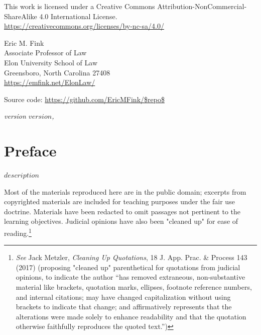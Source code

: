 \begin{small}
\raggedright{This work is licensed under a Creative Commons Attribution-NonCommercial-ShareAlike 4.0 International License.} \\
\url{https://creativecommons.org/licenses/by-nc-sa/4.0/}

\vspace{1em}

Eric M. Fink\\
Associate Professor of Law \\
Elon University School of Law \\
Greensboro, North Carolina 27408 \\
\url{https://emfink.net/ElonLaw/}

\vspace{1em}

Source code: \url{https://github.com/EricMFink/$repo$}

\itshape{version $version$, \monthyear}

\end{small}
\endgroup

\clearpage


\thispagestyle{empty}

\vspace*{\fill}
\vspace*{\fill}

\chapter*{Preface}

{$description$}

Most of the materials reproduced here are in the public domain; excerpts from copyrighted materials are included for teaching purposes under the fair use doctrine. Materials have been redacted to omit passages not pertinent to the learning objectives. Judicial opinions have also been "cleaned up" for ease of reading.\footnote{\textit{See} Jack Metzler, {\textit{Cleaning Up Quotations}}, 18 J. App. Prac. \& Process 143 (2017) (proposing "cleaned up" parenthetical for quotations from judicial opinions, to indicate the author “has removed extraneous, non-substantive material like brackets, quotation marks, ellipses, footnote reference numbers, and internal citations; may have changed capitalization without using brackets to indicate that change; and affirmatively represents that the alterations were made solely to enhance readability and that the quotation otherwise faithfully reproduces the quoted text.”)} 